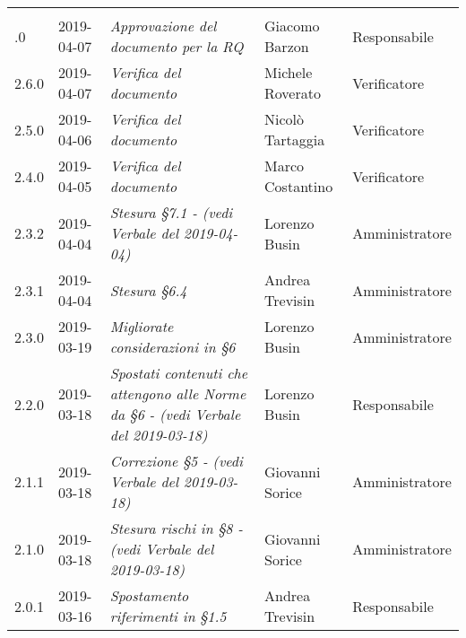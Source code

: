 \newpage
\section*{}
	\begin{longtable}{C{2cm}|C{2.5cm}|C{4.5cm}|C{2.5cm}|C{3cm}}

		 &  &  & &\\
		.0 & 2019-04-07 & \emph{Approvazione del documento per la RQ} & Giacomo Barzon & Responsabile \\
		\hline
		
		2.6.0 & 2019-04-07 & \emph{Verifica del documento} & Michele Roverato & Verificatore \\
		\hline
		
		2.5.0 & 2019-04-06 & \emph{Verifica del documento} & Nicolò Tartaggia & Verificatore \\
		\hline
		
		2.4.0 & 2019-04-05 & \emph{Verifica del documento} & Marco Costantino & Verificatore \\
		\hline
		
		2.3.2 & 2019-04-04 & \emph{Stesura §7.1 - (vedi Verbale del 2019-04-04)} & Lorenzo Busin & Amministratore \\
		\hline
		
		2.3.1 & 2019-04-04 & \emph{Stesura §6.4} & Andrea Trevisin & Amministratore \\
		\hline
		
		2.3.0 & 2019-03-19 & \emph{Migliorate considerazioni in §6} & Lorenzo Busin & Amministratore \\
		\hline
		
		2.2.0 & 2019-03-18 & \emph{Spostati contenuti che attengono alle Norme da §6 - (vedi Verbale del 2019-03-18)} & Lorenzo Busin & Responsabile \\
		\hline
		
		2.1.1 & 2019-03-18 & \emph{Correzione §5 - (vedi Verbale del 2019-03-18)} & Giovanni Sorice & Amministratore \\
		\hline
		
		2.1.0 & 2019-03-18 & \emph{Stesura rischi in §8 - (vedi Verbale del 2019-03-18)} & Giovanni Sorice & Amministratore \\
		\hline
		
		2.0.1 & 2019-03-16 & \emph{Spostamento riferimenti in §1.5} & Andrea Trevisin & Responsabile \\
		\hline		


\end{longtable}
